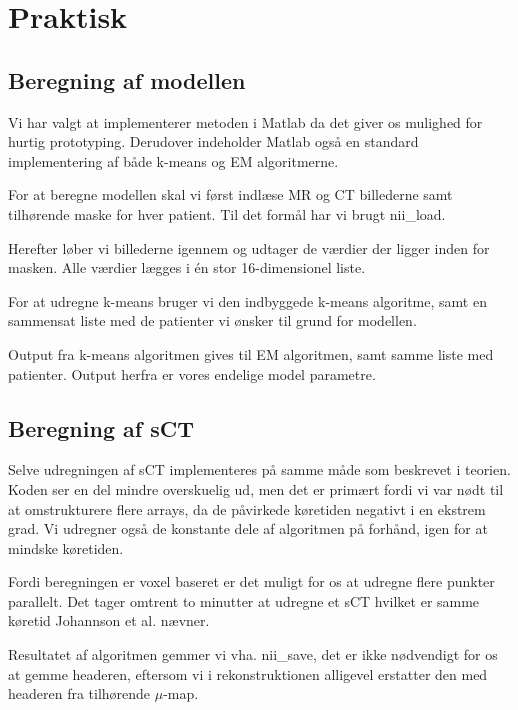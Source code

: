 \section{Praktisk}

\subsection{Beregning af modellen}

Vi har valgt at implementerer metoden i Matlab da det giver os mulighed for hurtig prototyping. Derudover indeholder Matlab også en standard implementering af både k-means og EM algoritmerne.

For at beregne modellen skal vi først indlæse MR og CT billederne samt tilhørende maske for hver patient. Til det formål har vi brugt nii\_load. 

Herefter løber vi billederne igennem og udtager de værdier der ligger inden for masken. Alle værdier lægges i én stor 16-dimensionel liste.

For at udregne k-means bruger vi den indbyggede k-means algoritme, samt en sammensat liste med de patienter vi ønsker til grund for modellen.

Output fra k-means algoritmen gives til EM algoritmen, samt samme liste med patienter. Output herfra er vores endelige model parametre.

\subsection{Beregning af sCT}

Selve udregningen af sCT implementeres på samme måde som beskrevet i teorien. Koden ser en del mindre overskuelig ud, men det er primært fordi vi var nødt til at omstrukturere flere arrays, da de påvirkede køretiden negativt i en ekstrem grad. Vi udregner også de konstante dele af algoritmen på forhånd, igen for at mindske køretiden.

Fordi beregningen er voxel baseret er det muligt for os at udregne flere punkter parallelt. Det tager omtrent to minutter at udregne et sCT hvilket er samme køretid Johannson et al. nævner.

Resultatet af algoritmen gemmer vi vha. nii\_save, det er ikke nødvendigt for os at gemme headeren, eftersom vi i rekonstruktionen alligevel erstatter den med headeren fra tilhørende $\mu$-map.
